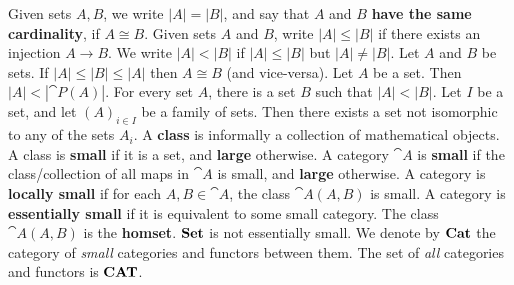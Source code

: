  Given sets $A,B$, we write $|A| = |B|$, and say that $A$ and $B$ \textbf{have the same cardinality}, if $A \cong B$.
 Given sets $A$ and $B$, write $|A| \le |B|$ if there exists an injection $A \to B$. We write $|A| < |B|$ if $|A| \le |B|$ but $|A| \ne |B|$.
 Let $A$ and $B$ be sets. If $|A| \le |B| \le |A|$ then $A \cong B$ (and vice-versa).
 Let $A$ be a set. Then $|A| < |\cat{P}(A)|$.
 For every set $A$, there is a set $B$ such that $|A| < |B|$.
 Let $I$ be a set, and let $(A)_{i \in I}$ be a family of sets. Then there exists a set not isomorphic to any of the sets $A_i$.
 A \textbf{class} is informally a collection of mathematical objects. A class is \textbf{small} if it is a set, and \textbf{large} otherwise.
 A category $\cat A$ is \textbf{small} if the class/collection of all maps in $\cat A$ is small, and \textbf{large} otherwise. A category is \textbf{locally small} if for each $A,B \in \cat A$, the class $\cat A(A,B)$ is small. A category is \textbf{essentially small} if it is equivalent to some small category. 
 The class $\cat{A}(A,B)$ is the \textbf{homset}.
 $\operatorname{\mathbf{Set}}$ is not essentially small.
 We denote by $\operatorname{\mathbf{Cat}}$ the category of \emph{small} categories and functors between them. The set of \emph{all} categories and functors is $\operatorname{\mathbf{CAT}}$.